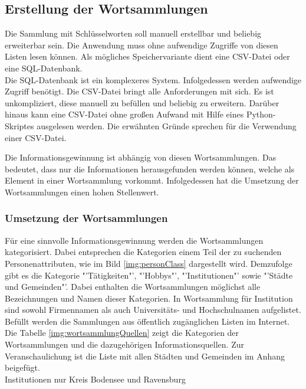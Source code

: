 	\subsection{Erstellung der Wortsammlungen}
	Die Sammlung mit Schlüsselworten soll manuell erstellbar und beliebig erweiterbar sein. Die Anwendung muss ohne aufwendige Zugriffe von diesen Listen lesen können. Als mögliches Speichervariante dient eine CSV-Datei oder eine SQL-Datenbank.\\
	Die SQL-Datenbank ist ein komplexeres System. Infolgedessen werden aufwendige Zugriff benötigt. Die CSV-Datei bringt alle Anforderungen mit sich. Es ist unkompliziert, diese manuell zu befüllen und beliebig zu erweitern. Darüber hinaus kann eine CSV-Datei ohne großen Aufwand mit Hilfe eines Python-Skriptes ausgelesen werden. Die erwähnten Gründe sprechen für die Verwendung einer CSV-Datei.
	
	Die Informationsgewinnung ist abhängig von diesen Wortsammlungen. Das bedeutet, dass nur die Informationen herausgefunden werden können, welche als Element in einer Wortsammlung vorkommt. Infolgedessen hat die Umsetzung der Wortsammlungen einen hohen Stellenwert.
	
		
		\subsubsection{Umsetzung der Wortsammlungen}	
		Für eine sinnvolle Informationsgewinnung werden die Wortsammlungen kategorisiert. Dabei entsprechen die Kategorien einem Teil der zu suchenden Personenattributen, wie im Bild \ref{img:personClass} dargestellt wird. Demzufolge gibt es die Kategorie "'Tätigkeiten"', "'Hobbys"', "'Institutionen"' sowie "'Städte und Gemeinden"'. Dabei enthalten die Wortsammlungen möglichst alle Bezeichnungen und Namen dieser Kategorien. 
		In Wortsammlung für Institution sind sowohl Firmennamen als auch Universitäts- und Hochschulnamen aufgelistet. Befüllt werden die Sammlungen aus öffentlich zugänglichen Listen im Internet. Die Tabelle \ref{img:wortsammlungQuellen} zeigt die Kategorien der Wortsammlungen und die dazugehörigen Informationsquellen. Zur Veranschaulichung ist die Liste mit allen Städten und Gemeinden im Anhang beigefügt. \\%
		Institutionen nur Kreis Bodensee und Ravensburg
		

